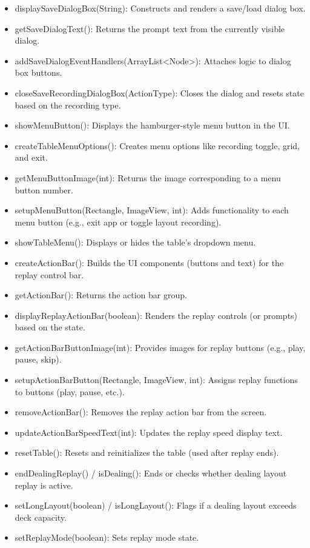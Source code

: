 \documentclass[a4paper]{project}
\begin{document}
\begin{itemize}
					\item displaySaveDialogBox(String): Constructs and renders a save/load dialog box.
					\item getSaveDialogText(): Returns the prompt text from the currently visible dialog.
					\item addSaveDialogEventHandlers(ArrayList<Node>): Attaches logic to dialog box buttons.
					\item closeSaveRecordingDialogBox(ActionType): Closes the dialog and resets state based on the recording type.
					\item showMenuButton(): Displays the hamburger-style menu button in the UI.
					\item createTableMenuOptions(): Creates menu options like recording toggle, grid, and exit.
					\item getMenuButtonImage(int): Returns the image corresponding to a menu button number.
					\item setupMenuButton(Rectangle, ImageView, int): Adds functionality to each menu button (e.g., exit app or toggle layout recording).
					\item showTableMenu(): Displays or hides the table's dropdown menu.
					\item createActionBar(): Builds the UI components (buttons and text) for the replay control bar.
					\item getActionBar(): Returns the action bar group.
					\item displayReplayActionBar(boolean): Renders the replay controls (or prompts) based on the state.
					\item getActionBarButtonImage(int): Provides images for replay buttons (e.g., play, pause, skip).
					\item setupActionBarButton(Rectangle, ImageView, int): Assigns replay functions to buttons (play, pause, etc.).
					\item removeActionBar(): Removes the replay action bar from the screen.
					\item updateActionBarSpeedText(int): Updates the replay speed display text.
					\item resetTable(): Resets and reinitializes the table (used after replay ends).
					\item endDealingReplay() / isDealing(): Ends or checks whether dealing layout replay is active.
					\item setLongLayout(boolean) / isLongLayout(): Flags if a dealing layout exceeds deck capacity.
					\item setReplayMode(boolean): Sets replay mode state.
				\end{itemize}
			
\end{document}
